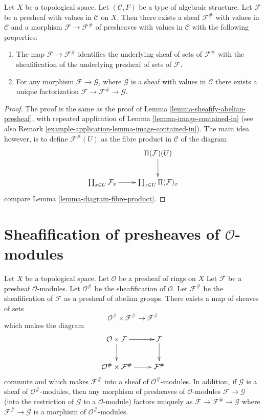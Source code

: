 \begin{lemma}
\label{lemma-sheafify-presheaf-structures}
Let $X$ be a topological space.
Let $(\mathcal{C}, F)$ be a type of algebraic structure.
Let $\mathcal{F}$ be a presheaf with values in $\mathcal{C}$
on $X$. Then there exists a sheaf $\mathcal{F}^\#$ with values
in $\mathcal{C}$ and a morphism $\mathcal{F} \to \mathcal{F}^\#$
of presheaves with values in $\mathcal{C}$ with the
following properties:
\begin{enumerate}
\item The map $\mathcal{F} \to \mathcal{F}^\#$ identifies
the underlying sheaf of sets of $\mathcal{F}^\#$ with
the sheafification of the underlying presheaf of sets of $\mathcal{F}$.
\item For any morphism $\mathcal{F} \to \mathcal{G}$, where
$\mathcal{G}$ is a sheaf with values in $\mathcal{C}$ there exists
a unique factorization $\mathcal{F} \to \mathcal{F}^\# \to \mathcal{G}$.
\end{enumerate}
\end{lemma}

\begin{proof}
The proof is the same as the proof of
Lemma \ref{lemma-sheafify-abelian-presheaf},
with repeated application of
Lemma \ref{lemma-image-contained-in} (see also
Remark \ref{example-application-lemma-image-contained-in}).
The main idea however, is to define $\mathcal{F}^\#(U)$
as the fibre product in $\mathcal{C}$ of the diagram
$$
\xymatrix{
 &
\Pi(\mathcal{F})(U) \ar[d] \\
\prod_{x \in U} \mathcal{F}_x
\ar[r] &
\prod_{x \in U} \Pi(\mathcal{F})_x
}
$$
compare Lemma \ref{lemma-diagram-fibre-product}.
\end{proof}

\section{Sheafification of presheaves of $\mathcal{O}$-modules}
\label{section-sheafification-presheaves-modules}

\begin{lemma}
\label{lemma-sheafification-presheaf-modules}
Let $X$ be a topological space.
Let $\mathcal{O}$ be a presheaf of rings on $X$
Let $\mathcal{F}$ be a presheaf $\mathcal{O}$-modules.
Let $\mathcal{O}^\#$ be the sheafification of $\mathcal{O}$.
Let $\mathcal{F}^\#$ be the sheafification of $\mathcal{F}$
as a presheaf of abelian groups. There exists a map of
sheaves of sets
$$
\mathcal{O}^\# \times \mathcal{F}^\#
\longrightarrow
\mathcal{F}^\#
$$
which makes the diagram
$$
\xymatrix{
\mathcal{O} \times \mathcal{F} \ar[r] \ar[d] &
\mathcal{F} \ar[d] \\
\mathcal{O}^\# \times \mathcal{F}^\# \ar[r] &
\mathcal{F}^\#
}
$$
commute and which makes $\mathcal{F}^\#$ into a sheaf
of $\mathcal{O}^\#$-modules. In addition, if $\mathcal{G}$
is a sheaf of $\mathcal{O}^\#$-modules, then any morphism
of presheaves of $\mathcal{O}$-modules $\mathcal{F} \to \mathcal{G}$
(into the restriction of $\mathcal{G}$ to a $\mathcal{O}$-module)
factors uniquely as $\mathcal{F} \to \mathcal{F}^\# \to \mathcal{G}$
where $\mathcal{F}^\# \to \mathcal{G}$ is a morphism of 
$\mathcal{O}^\#$-modules.
\end{lemma}

